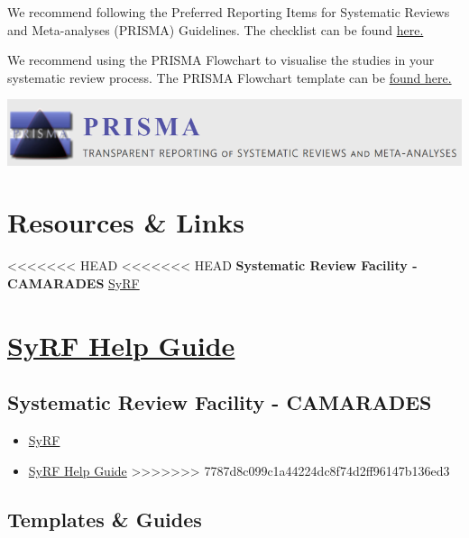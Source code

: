 \documentclass[
]{book}
\providecommand{\tightlist}{%
  \setlength{\itemsep}{0pt}\setlength{\parskip}{0pt}}
\begin{document}
We recommend following the Preferred Reporting Items for Systematic Reviews and Meta-analyses (PRISMA) Guidelines. The checklist can be found \href{http://www.prisma-statement.org/PRISMAStatement/Checklist}{here.}

We recommend using the PRISMA Flowchart to visualise the studies in your systematic review process. The PRISMA Flowchart template can be \href{http://prisma-statement.org/prismastatement/flowdiagram}{found here.}

\includegraphics{figs/PRISMA.png}

\hypertarget{resources-links}{%
\chapter{Resources \& Links}\label{resources-links}}

\textless\textless\textless\textless\textless\textless\textless{} HEAD
\textless\textless\textless\textless\textless\textless\textless{} HEAD
\textbf{Systematic Review Facility - CAMARADES}
\href{https://syrf.org.uk/}{SyRF}

\hypertarget{syrf-help-guide}{%
\chapter{\texorpdfstring{\href{https://help.syrf.org.uk/}{SyRF Help Guide}}{SyRF Help Guide}}\label{syrf-help-guide}}

\hypertarget{systematic-review-facility---camarades}{%
\section{Systematic Review Facility - CAMARADES}\label{systematic-review-facility---camarades}}

\begin{itemize}
\tightlist
\item
  \href{http://syrf.org.uk/}{SyRF}
\item
  \href{https://assets.syrf.org.uk/guides/SyRF_User_Guide.pdf}{SyRF Help Guide}
  \textgreater\textgreater\textgreater\textgreater\textgreater\textgreater\textgreater{} 7787d8c099c1a44224dc8f74d2ff96147b136ed3
\end{itemize}

\hypertarget{templates-guides}{%
\section{Templates \& Guides}\label{templates-guides}}
\end{document}
